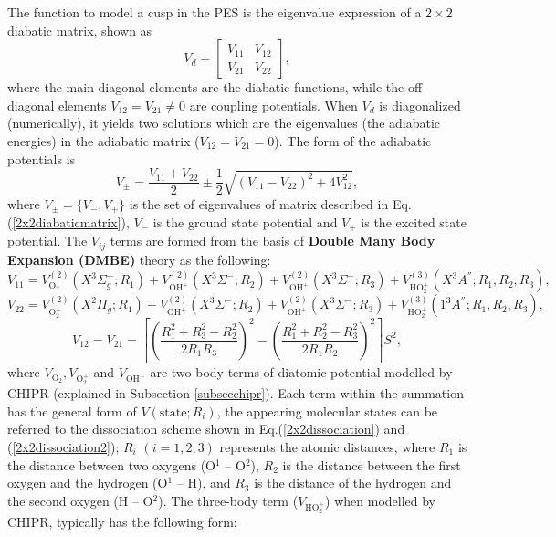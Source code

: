\documentclass[12pt]{article}
\begin{document}
The function to model a cusp in the PES is the eigenvalue expression of a $2 \times 2$ diabatic matrix, shown as
\begin{equation}
    V_d = 
    \begin{bmatrix}
        V_{11} & V_{12} \\
        V_{21} & V_{22}
    \end{bmatrix}
    ,
\label{2x2diabaticmatrix}
\end{equation}
where the main diagonal elements are the diabatic functions, while the off-diagonal elements $V_{12} = V_{21} \neq 0$ are coupling potentials. When $V_d$ is diagonalized (numerically), it yields two solutions which are the eigenvalues (the adiabatic energies) in the adiabatic matrix ($V_{12} = V_{21} = 0$). The form of the adiabatic potentials is
\begin{equation}
    V_{\pm} = \frac{V_{11} + V_{22}}{2} \pm \frac{1}{2}\sqrt{(V_{11} - V_{22})^2 + 4V_{12}^2},
\label{2x2ev}
\end{equation}
where $V_{\pm} = \{V_-, V_+\}$ is the set of eigenvalues of matrix described in Eq.(\ref{2x2diabaticmatrix}), $V_-$ is the ground state potential and $V_+$ is the excited state potential. The $V_{ij}$ terms are formed from the basis of \textbf{Double Many Body Expansion (DMBE)} theory as the following:
\begin{equation}
    V_{11} = V_{\text{O}_2}^{(2)}(X^3\Sigma^-_g; R_1) + V_{\text{OH}^+}^{(2)}(X^3\Sigma^-; R_2) + V_{\text{OH}^+}^{(2)}(X^3\Sigma^-; R_3) + V_{\text{HO}^+_2}^{(3)}(X^3A^{''}; R_1, R_2, R_3),
\label{eq2x2v11}
\end{equation}
\begin{equation}
    V_{22} = V_{\text{O}_2^+}^{(2)}(X^2\Pi_g; R_1) + V_{\text{OH}^+}^{(2)}(X^3\Sigma^-; R_2) + V_{\text{OH}^+}^{(2)}(X^3\Sigma^-; R_3) + V_{\text{HO}^+_2}^{(3)}(1^3A^{''}; R_1, R_2, R_3),
\label{eq2x2v22}
\end{equation}
\begin{equation}
    V_{12} = V_{21} = \left[ \left(\frac{R_1^2 + R_3^2 -R_2^2}{2R_1R_3} \right)^2 - \left(\frac{R_1^2 + R_2^2 -R_3^2}{2R_1R_2} \right)^2\right]S^2,
\label{eq2x2v12}
\end{equation}
where $V_{\text{O}_2}, V_{\text{O}_2^+}$ and $V_{\text{OH}^+}$ are two-body terms of diatomic potential modelled by CHIPR (explained in Subsection \ref{subsecchipr}). Each term within the summation has the general form of $V(\text{state};R_i)$, the appearing molecular states can be referred to the dissociation scheme shown in Eq.(\ref{2x2dissociation}) and (\ref{2x2dissociation2}); $R_i$ $(i=1,2,3)$ represents the atomic distances, where $R_1$ is the distance between two oxygens (O$^1$ -- O$^2$), $R_2$ is the distance between the first oxygen and the hydrogen (O$^1$ -- H), and $R_3$ is the distance of the hydrogen and the second oxygen (H -- O$^2$). The three-body term ($V_{\text{HO}^+_2}$) when modelled by CHIPR, typically has the following form:
\end{document}
